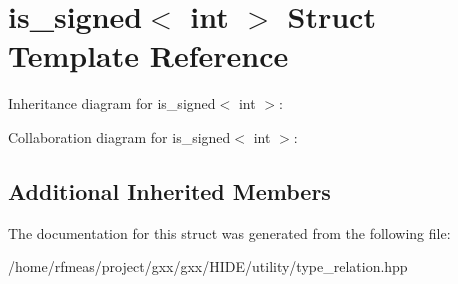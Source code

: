 \hypertarget{structis__signed_3_01int_01_4}{}\section{is\+\_\+signed$<$ int $>$ Struct Template Reference}
\label{structis__signed_3_01int_01_4}


Inheritance diagram for is\+\_\+signed$<$ int $>$\+:


Collaboration diagram for is\+\_\+signed$<$ int $>$\+:
\subsection*{Additional Inherited Members}


The documentation for this struct was generated from the following file\+:\begin{DoxyCompactItemize}
\item 
/home/rfmeas/project/gxx/gxx/\+H\+I\+D\+E/utility/type\+\_\+relation.\+hpp\end{DoxyCompactItemize}
